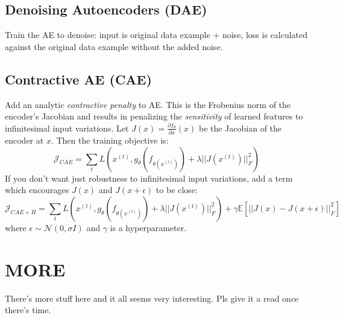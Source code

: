 \documentclass{article}
\begin{document}
\subsection{Denoising Autoencoders (DAE)}
Train the AE to denoise: input is original data example + noise,
loss is calculated against the original data example without the added noise.

\subsection{Contractive AE (CAE)}
Add an analytic \textit{contractive penalty} to AE.
This is the Frobenius norm of the encoder's Jacobian
and results in penalizing the \textit{sensitivity} of learned features
to infinitesimal input variations.
Let $ J (x) = \frac{\partial f_{ \theta }}{\partial x}  (x) $ be the Jacobian
of the encoder at $ x  $.
Then the training objective is:
\begin{equation}
		\mathcal{J}_{ CAE } = \sum_{t}^{} 
		L (x^{ (t) }, g_{ \theta } (f_{ \theta (x^{ (t) }) }) + \lambda || J (x^{ (t) }) ||^{ 2 }_{ F })
\end{equation}
If you don't want just robustness to infinitesimal input variations,
add a term which encourages $ J (x)  $ and $ J (x +\epsilon)  $ to be close:
\begin{equation}
		\mathcal{J}_{ CAE + H } = \sum_{t}^{} 
		L (x^{ (t) }, g_{ \theta } (f_{ \theta (x^{ (t) }) }) + \lambda || J (x^{ (t) }) ||^{ 2 }_{ F })
		+ \gamma \mathbb{E} \left[ 
|| J (x) - J (x +\epsilon) ||^{ 2 }_{ F }
		\right] 
\end{equation}
where $ \epsilon \sim \mathcal{N} (0, \sigma I)  $ and $ \gamma   $ is
a hyperparameter.

\section{MORE}
There's more stuff here and it all seems very interesting.
Pls give it a read once there's time.
\end{document}
